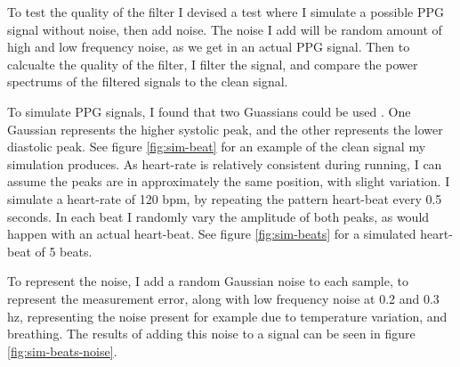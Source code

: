 \documentclass[12pt,a4paper,twoside,openright]{report}
\begin{document}
To test the quality of the filter I devised a test where I simulate a possible
PPG signal without noise, then add noise. The noise I add will be random
amount of high and low frequency noise, as we get in an actual PPG signal.
Then to calcualte the quality of the filter, I filter the signal, and compare
the power spectrums of the filtered signals to the clean signal.

To simulate PPG signals, I found that two Guassians could be used
\cite{Banerjee15}. One Gaussian represents the higher systolic peak, and the
other represents the lower diastolic peak. 
See figure \ref{fig:sim-beat} for an example of the clean signal my simulation
produces. As heart-rate is relatively
consistent during running, I can assume the peaks are in approximately the
same position, with slight variation. I simulate a heart-rate of 120 bpm, by
repeating the pattern heart-beat every 0.5 seconds. In each beat I randomly
vary the amplitude of both peaks, as would happen with an actual heart-beat.
See figure \ref{fig:sim-beats} for a simulated heart-beat of 5 beats.

To represent the noise, I add a random Gaussian noise to each sample, to
represent the measurement error, along with low frequency noise at 0.2 and 0.3
hz, representing the noise present for example due to temperature variation,
and breathing.  
The results of adding this noise to a signal can be seen in figure
\ref{fig:sim-beats-noise}.
\end{document}
